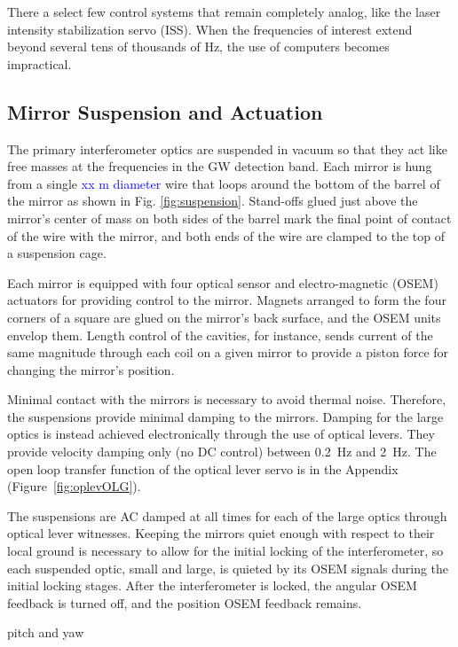 There a select few control systems that remain completely analog, like
the laser intensity stabilization servo (ISS). When the frequencies of
interest extend beyond several tens of thousands of Hz, the use of
computers becomes impractical.




\subsection{Mirror Suspension and Actuation}
\label{sec:suspension}
The primary interferometer optics are suspended in vacuum so that they
act like free masses at the frequencies in the GW detection band. Each
mirror is hung from a single \textcolor{blue}{xx m diameter} wire that
loops around the bottom of the barrel of the mirror as shown in
Fig. \ref{fig:suspension}. Stand-offs glued just above the mirror's
center of mass on both sides of the barrel mark the final point of
contact of the wire with the mirror, and both ends of the wire are
clamped to the top of a suspension cage.

Each mirror is equipped with four optical sensor and electro-magnetic
(OSEM) actuators for providing control to the mirror. Magnets arranged
to form the four corners of a square are glued on the mirror's back
surface, and the OSEM units envelop them. Length control of the
cavities, for instance, sends current of the same magnitude through
each coil on a given mirror to provide a piston force for changing the
mirror's position.

Minimal contact with the mirrors is necessary to avoid thermal
noise. Therefore, the suspensions provide minimal damping to the
mirrors. Damping for the large optics is instead achieved
electronically through the use of optical levers. They provide
velocity damping only (no DC control) between 0.2~Hz and 2~Hz. The
open loop transfer function of the optical lever servo is in the
Appendix (Figure~\ref{fig:oplevOLG}).

The suspensions are AC damped at all times for each of the large
optics through optical lever witnesses. Keeping the mirrors quiet
enough with respect to their local ground is necessary to allow for
the initial locking of the interferometer, so each suspended optic,
small and large, is quieted by its OSEM signals during the initial
locking stages. After the interferometer is locked, the angular OSEM
feedback is turned off, and the position OSEM feedback remains.

pitch and yaw

